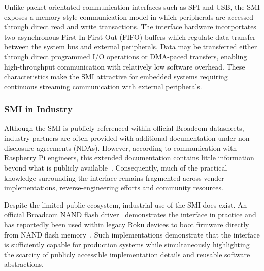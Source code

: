 \documentclass[final]{cmpreport}
\begin{document}
Unlike packet-orientated communication interfaces such as SPI and USB, the SMI exposes a memory-style communication model in which peripherals are accessed through direct read and write transactions. The interface hardware incorportates two asynchronous First In First Out (FIFO) buffers which regulate data transfer between the system bus and external peripherals. Data may be transferred either through direct programmed I/O operations or DMA-paced transfers, enabling high-throughput communication with relatively low software overhead. These characteristics make the SMI attractive for embedded systems requiring continuous streaming communication with external peripherals.

\subsubsection{SMI in Industry}
Although the SMI is publicly referenced within official Broadcom datasheets, industry partners are often provided with additional documentation under non-disclosure agreements (NDAs). However, according to communication with Raspberry Pi engineers, this extended documentation contains little information beyond what is publicly available~\cite{zotero-item-18}. Consequently, much of the practical knowledge surrounding the interface remains fragmented across vender implementations, reverse-engineering efforts and community resources.

Despite the limited public ecosystem, industrial use of the SMI does exist. An official Broadcom NAND flash driver~\cite{nandflashdriver} demonstrates the interface in practice and has reportedly been used within legacy Roku devices to boot firmware directly from NAND flash memory~\cite{byRaspberryPiHat2021}. Such implementations demonstrate that the interface is sufficiently capable for production systems while simultaneously highlighting the scarcity of publicly accessible implementation details and reusable software abstractions.
\end{document}
